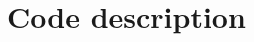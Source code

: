\documentclass[notitlepage]{article}
\newcommand{\highlight}[1]{{\cellcolor{yellow!30} #1}}
\begin{document}


\restoregeometry


\section{Code description}
\end{document}
